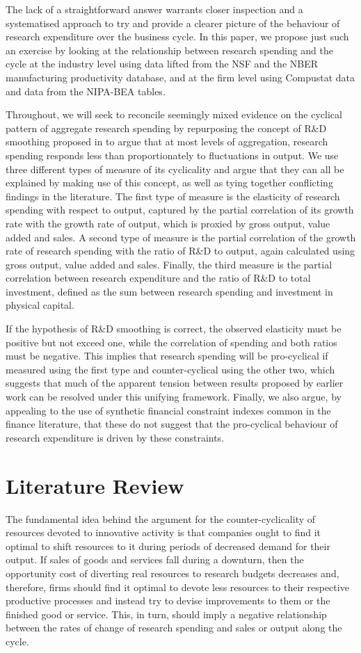 \documentclass{_latex/house}
\begin{document}
The lack of a straightforward answer warrants closer inspection and a systematised approach to try and provide a clearer picture of the behaviour of research expenditure over the business cycle. In this paper, we propose just such an exercise by looking at the relationship between research spending and the cycle at the industry level using data lifted from the NSF and the NBER manufacturing productivity database, and at the firm level using Compustat data and data from the NIPA-BEA tables.

Throughout, we will seek to reconcile seemingly mixed evidence on the cyclical pattern of aggregate research spending by repurposing the concept of R\&D smoothing proposed in \cite{Brown2011694} to argue that at most levels of aggregation, research spending responds less than proportionately to fluctuations in output. We use three different types of measure of its cyclicality and argue that they can all be explained by making use of this concept, as well as tying together conflicting findings in the literature. The first type of measure is the elasticity of research spending with respect to output, captured by the partial correlation of its growth rate with the growth rate of output, which is proxied by gross output, value added and sales. A second type of measure is the partial correlation of the growth rate of research spending with the ratio of R\&D to output, again calculated using gross output, value added and sales. Finally, the third measure is the partial correlation between research expenditure and the ratio of R\&D to total investment, defined as the sum between research spending and investment in physical capital.

If the hypothesis of R\&D smoothing is correct, the observed elasticity must be positive but not exceed one, while the correlation of spending and both ratios must be negative. This implies that research spending will be pro-cyclical if measured using the first type and counter-cyclical using the other two, which suggests that much of the apparent tension between results proposed by earlier work can be resolved under this unifying framework. Finally, we also argue, by appealing to the use of synthetic financial constraint indexes common in the finance literature, that these do not suggest that the pro-cyclical behaviour of research expenditure is driven by these constraints.
\section{Literature Review} \label{literaturereview}
The fundamental idea behind the argument for the counter-cyclicality of resources devoted to innovative activity is that companies ought to find it optimal to shift resources to it during periods of decreased demand for their output. If sales of goods and services fall during a downturn, then the opportunity cost of diverting real resources to research budgets decreases and, therefore, firms should find it optimal to devote less resources to their respective productive processes and instead try to devise improvements to them or the finished good or service. This, in turn, should imply a negative relationship between the rates of change of research spending and sales or output along the cycle.
\end{document}
